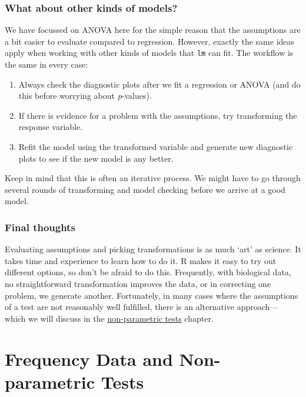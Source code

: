 \documentclass[
]{book}
\providecommand{\tightlist}{%
  \setlength{\itemsep}{0pt}\setlength{\parskip}{0pt}}
\begin{document}
\hypertarget{what-about-other-kinds-of-models}{%
\section{What about other kinds of models?}\label{what-about-other-kinds-of-models}}

We have focussed on ANOVA here for the simple reason that the assumptions are a bit easier to evaluate compared to regression. However, exactly the same ideas apply when working with other kinds of models that \texttt{lm} can fit. The workflow is the same in every case:

\begin{enumerate}
\def\labelenumi{\arabic{enumi}.}
\tightlist
\item
  Always check the diagnostic plots after we fit a regression or ANOVA (and do this before worrying about \emph{p}-values).
\item
  If there is evidence for a problem with the assumptions, try transforming the response variable.
\item
  Refit the model using the transformed variable and generate new diagnostic plots to see if the new model is any better.
\end{enumerate}

Keep in mind that this is often an iterative process. We might have to go through several rounds of transforming and model checking before we arrive at a good model.

\hypertarget{final-thoughts}{%
\section{Final thoughts}\label{final-thoughts}}

Evaluating assumptions and picking transformations is as much `art' as science. It takes time and experience to learn how to do it. R makes it easy to try out different options, so don't be afraid to do this. Frequently, with biological data, no straightforward transformation improves the data, or in correcting one problem, we generate another. Fortunately, in many cases where the assumptions of a test are not reasonably well fulfilled, there is an alternative approach--- which we will discuss in the \protect\hyperlink{non-parametric-tests}{non-parametric tests} chapter.

\hypertarget{part-frequency-data-and-non-parametric-tests}{%
\part{Frequency Data and Non-parametric Tests}\label{part-frequency-data-and-non-parametric-tests}}
\end{document}
